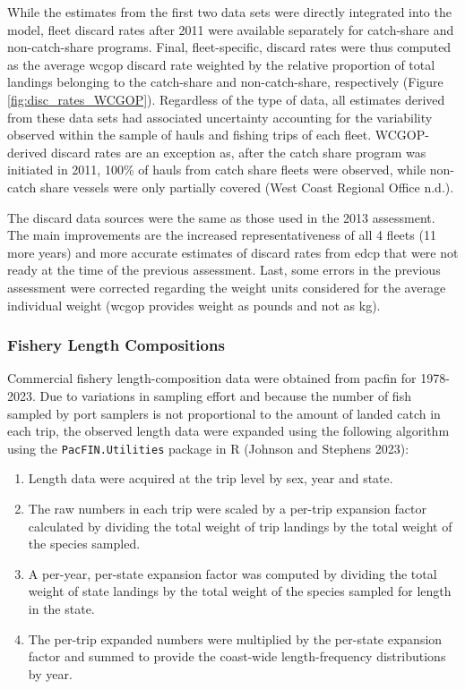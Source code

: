 \documentclass[11pt,
  english,
  letterpaper,
]{article}
\providecommand{\tightlist}{%
  \setlength{\itemsep}{0pt}\setlength{\parskip}{0pt}}
\providecommand{\tightlist}{%
  \setlength{\itemsep}{0pt}\setlength{\parskip}{0pt}}
\begin{document}
While the estimates from the first two data sets were directly integrated into the model, fleet discard rates after 2011 were available separately for catch-share and non-catch-share programs. Final, fleet-specific, discard rates were thus computed as the average \gls{wcgop} discard rate weighted by the relative proportion of total landings belonging to the catch-share and non-catch-share, respectively (Figure \ref{fig:disc_rates_WCGOP}). Regardless of the type of data, all estimates derived from these data sets had associated uncertainty accounting for the variability observed within the sample of hauls and fishing trips of each fleet. WCGOP-derived discard rates are an exception as, after the catch share program was initiated in 2011, 100\% of hauls from catch share fleets were observed, while non-catch share vessels were only partially covered (West Coast Regional Office n.d.).

The discard data sources were the same as those used in the 2013 assessment. The main improvements are the increased representativeness of all 4 fleets (11 more years) and more accurate estimates of discard rates from \gls{edcp} that were not ready at the time of the previous assessment. Last, some errors in the previous assessment were corrected regarding the weight units considered for the average individual weight (\gls{wcgop} provides weight as pounds and not as kg).

\hypertarget{fishery-length-compositions}{%
\subsubsection{Fishery Length Compositions}\label{fishery-length-compositions}}

Commercial fishery length-composition data were obtained from \gls{pacfin} for 1978-2023. Due to variations in sampling effort and because the number of fish sampled by port samplers is not proportional to the amount of landed catch in each trip, the observed length data were expanded using the following algorithm using the \texttt{PacFIN.Utilities} package in R (Johnson and Stephens 2023):

\begin{enumerate}
\def\labelenumi{\arabic{enumi}.}
\tightlist
\item
  Length data were acquired at the trip level by sex, year and state.
\item
  The raw numbers in each trip were scaled by a per-trip expansion factor calculated by dividing the total weight of trip landings by the total weight of the species sampled.
\item
  A per-year, per-state expansion factor was computed by dividing the total weight of state landings by the total weight of the species sampled for length in the state.
\item
  The per-trip expanded numbers were multiplied by the per-state expansion factor and summed to provide the coast-wide length-frequency distributions by year.
\end{enumerate}
\end{document}
